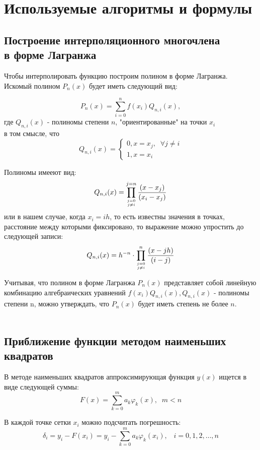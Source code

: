 \documentclass[a4paper, 14pt]{extreport}
\begin{document}
\section*{Используемые алгоритмы и формулы}
\subsection*{Построение интерполяционного многочлена \\ в форме Лагранжа}
\;\;\;\;\;\;Чтобы интерполировать функцию построим полином в форме Лагранжа. \\ Искомый полином $P_{n}(x)$ будет иметь следующий вид:

$$P_{n}(x) = \sum_{i = 0}^{n} f\left(x_{i}\right) Q_{n, i}(x),$$
где $Q_{n, i}(x)$ - полиномы степени $n$, "ориентированные" на точки $x_{i}$ \\ в том смысле, что
$$
Q_{n, i}(x)=\left\{\begin{array}{l}0, x=x_{j}, \; \; \forall j \neq i \\ 1, x=x_{i}\end{array}\right. $$

{Полиномы имееют вид: $$Q_{n, i}(x)=\prod_{j=0 \atop j \neq i}^{j=n} \frac{\left(x-x_{j}\right)}{\left(x_{i}-x_{j}\right)}$$}
или в нашем случае, когда $x_{i} = ih$, то есть известны значения в точках, расстояние между которыми фиксировано, то выражение можно упростить до следующей записи:
$$	
Q_{n, i}(x)=h^{-n} \cdot \prod_{j=0 \atop j \neq i}^{n} \frac{(x-j h)}{(i-j)}
$$

Учитывая, что полином в форме Лагранжа $P_{n}(x)$ представляет собой линейную комбинацию алгебраических уравнений $f(x_{i})Q_{n, i}(x), Q_{n, i}(x)$ - полиномы степени n, можно утверждать, что $P_{n}(x)$ будет иметь степень не более $n$.
\\ \\
\subsection*{Приближение функции методом наименьших квадратов}

\;\;\;\;\;\;В методе наименьших квадратов аппроксимирующая функция $y(x)$ ищется в виде следующей суммы:
$$F(x)=\sum_{k=0}^{m} a_{k} \varphi_{k}(x), \; \; m<n$$

{В каждой точке сетки $x_{i}$ можно подсчитать погрешность:}
$$\delta_{i}=y_{i}-F\left(x_{i}\right)=y_{i}-\sum_{k=0}^{m} a_{k} \varphi_{k}\left(x_{i}\right), \; \; \; i=0,1,2, \ldots, n$$
\end{document}
